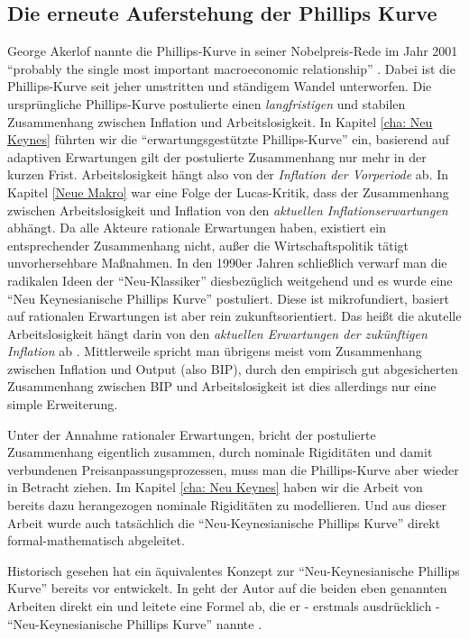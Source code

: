 \subsection{Die erneute Auferstehung der Phillips Kurve}
\label{NeuePhillips}
George Akerlof nannte die Phillips-Kurve in seiner Nobelpreis-Rede im Jahr 2001 "`probably the single most important macroeconomic relationship"' \parencite{Nobelpreis-Komitee2001}. Dabei ist die Phillips-Kurve seit jeher umstritten und ständigem Wandel unterworfen. Die ursprüngliche Phillips-Kurve postulierte einen \textit{langfristigen} und stabilen Zusammenhang zwischen Inflation und Arbeitslosigkeit. In Kapitel \ref{cha: Neu Keynes} führten wir die "`erwartungsgestützte Phillips-Kurve"' ein, basierend auf adaptiven Erwartungen gilt der postulierte Zusammenhang nur mehr in der kurzen Frist. Arbeitslosigkeit hängt also von der \textit{Inflation der Vorperiode} ab. In Kapitel \ref{Neue Makro} war eine Folge der Lucas-Kritik, dass der Zusammenhang zwischen Arbeitslosigkeit und Inflation von den \textit{aktuellen Inflationserwartungen} abhängt. Da alle Akteure rationale Erwartungen haben, existiert ein entsprechender Zusammenhang nicht, außer die Wirtschaftspolitik tätigt unvorhersehbare Maßnahmen. In den 1990er Jahren schließlich verwarf man die radikalen Ideen der "`Neu-Klassiker"' diesbezüglich weitgehend und es wurde eine "`Neu Keynesianische Phillips Kurve"' postuliert. Diese ist mikrofundiert, basiert auf rationalen Erwartungen ist aber rein zukunftsorientiert. Das heißt die akutelle Arbeitslosigkeit hängt darin von den \textit{aktuellen Erwartungen der zukünftigen Inflation} ab \parencite[S. 980]{Roberts1995}. Mittlerweile spricht man übrigens meist vom Zusammenhang zwischen Inflation und Output (also BIP), durch den empirisch gut abgesicherten Zusammenhang zwischen BIP und Arbeitslosigkeit ist dies allerdings nur eine simple Erweiterung.

Unter der Annahme rationaler Erwartungen, bricht der postulierte Zusammenhang eigentlich zusammen, durch nominale Rigiditäten und damit verbundenen Preisanpassungsprozessen, muss man die Phillips-Kurve aber wieder in Betracht ziehen. Im Kapitel \ref{cha: Neu Keynes} haben wir die Arbeit von \textcite{Calvo1983} bereits dazu herangezogen nominale Rigiditäten zu modellieren. Und aus dieser Arbeit wurde auch tatsächlich die "`Neu-Keynesianische Phillips Kurve"' direkt formal-mathematisch abgeleitet.

Historisch gesehen hat \textcite{Rotemberg1982} ein äquivalentes Konzept zur "`Neu-Keynesianische Phillips Kurve"' bereits vor \textcite{Calvo1983} entwickelt. In \textcite{Roberts1995} geht der Autor auf die beiden eben genannten Arbeiten direkt ein und leitete eine Formel ab, die er - erstmals ausdrücklich - "`Neu-Keynesianische Phillips Kurve"' nannte \parencite[S. 979]{Roberts1995}. 

